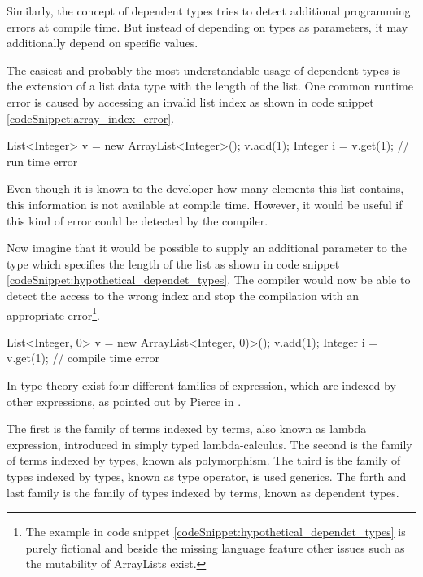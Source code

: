 Similarly, the concept of dependent types tries to detect additional programming errors at compile time.
But instead of depending on types as parameters, it may additionally depend on specific values. 

The easiest and probably the most understandable usage of dependent types is the extension of a list data type with the length of the list. 
One common runtime error is caused by accessing an invalid list index as shown in code snippet \ref{codeSnippet:array_index_error}.

\begin{codesnippet}[caption={ArrayList index error}, label={codeSnippet:array_index_error}]
List<Integer> v = new ArrayList<Integer>();
v.add(1);
Integer i = v.get(1); // run time error
\end{codesnippet}

Even though it is known to the developer how many elements this list contains, this information is not available at compile time. 
However, it would be useful if this kind of error could be detected by the compiler.

Now imagine that it would be possible to supply an additional parameter to the type which specifies the length of the list as shown in code snippet \ref{codeSnippet:hypothetical_dependet_types}. 
The compiler would now be able to detect the access to the wrong index and stop the compilation with an appropriate error\footnote{The example in code snippet \ref{codeSnippet:hypothetical_dependet_types} is purely fictional and beside the missing language feature other issues such as the mutability of ArrayLists exist.}.
\begin{adjustbox}{width=\columnwidth}
\begin{codesnippet}[escapeinside={(*}{*)}, caption={ArrayList with size parameter}, label={codeSnippet:hypothetical_dependet_types}]
List<Integer, 0> v = new ArrayList<Integer, 0)>();
v.add(1);
Integer i = v.get(1); // compile time error
\end{codesnippet}
\end{adjustbox}
\linebreak

In type theory exist four different families of expression, which are indexed by other expressions, as pointed out by Pierce in \cite{10.5555/1076265}. 

The first is the family of terms indexed by terms, also known as lambda expression, introduced in simply typed lambda-calculus. 
The second is the family of terms indexed by types, known als polymorphism. 
The third is the family of types indexed by types, known as type operator, is used generics. 
The forth and last family is the family of types indexed by terms, known as dependent types.

